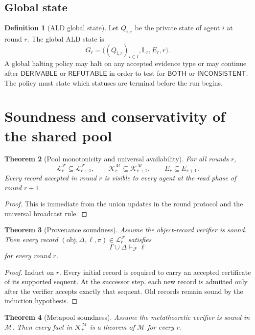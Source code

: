 \documentclass[11pt]{article}
\newtheorem{theorem}{Theorem}[section]
\theoremstyle{definition}
\newtheorem{definition}[theorem]{Definition}
\theoremstyle{remark}
\newcommand{\Pool}{\mathcal L}
\newcommand{\MetaPool}{\mathcal K}
\newcommand{\Der}{\mathsf{DERIVABLE}}
\newcommand{\Refut}{\mathsf{REFUTABLE}}
\newcommand{\Both}{\mathsf{BOTH}}
\newcommand{\Inc}{\mathsf{INCONSISTENT}}
\newcommand{\M}{\mathcal M}
\newcommand{\F}{\mathcal F}
\newcommand{\Gammaa}{\Gamma}
\begin{document}
\subsection{Global state}
\begin{definition}[ALD global state]
Let $Q_{i,r}$ be the private state of agent $i$ at round $r$. The global ALD state is
\[
G_r=\bigl((Q_{i,r})_{i\in I},\mathbb L_r,E_r,r\bigr).
\]
A global halting policy may halt on any accepted evidence type or may continue after $\Der$ or $\Refut$ in order to test for $\Both$ or $\Inc$. The policy must state which statuses are terminal before the run begins.
\end{definition}

\section{Soundness and conservativity of the shared pool}

\begin{theorem}[Pool monotonicity and universal availability]
For all rounds $r$,
\[
\Pool_r^{\F}\subseteq\Pool_{r+1}^{\F},\qquad
\MetaPool_r^{\M}\subseteq\MetaPool_{r+1}^{\M},\qquad
E_r\subseteq E_{r+1}.
\]
Every record accepted in round $r$ is visible to every agent at the read phase of round $r+1$.
\end{theorem}

\begin{proof}
This is immediate from the union updates in the round protocol and the universal broadcast rule.
\end{proof}

\begin{theorem}[Provenance soundness]
Assume the object-record verifier is sound. Then every record $(\mathrm{obj},\Delta,\ell,\pi)\in\Pool_r^{\F}$ satisfies
\[
\Gammaa\cup\Delta\vdash_{\F}\ell
\]
for every round $r$.
\end{theorem}

\begin{proof}
Induct on $r$. Every initial record is required to carry an accepted certificate of its supported sequent. At the successor step, each new record is admitted only after the verifier accepts exactly that sequent. Old records remain sound by the induction hypothesis.
\end{proof}

\begin{theorem}[Metapool soundness]
Assume the metatheoretic verifier is sound in $\M$. Then every fact in $\MetaPool_r^{\M}$ is a theorem of $\M$ for every $r$.
\end{theorem}
\end{document}
